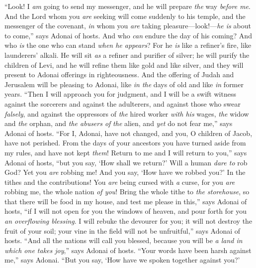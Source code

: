 \begin{biblechapter} %
 “Look! I \textit{am} going to send my messenger, and he will prepare \textit{the} way \textit{before me}. And the Lord whom you \textit{are} seeking will come suddenly to his temple, and the messenger of the covenant, \textit{in} whom you \textit{are} taking pleasure—look!—\textit{he is} about to come,” says Adonai of hosts.
\verse And who \textit{can} endure the day of his coming? And who \textit{is} the one who can stand \textit{when he appears}? For he \textit{is} like a refiner’s fire, like launderers’ alkali.
\verse He will sit \textit{as} a refiner and purifier of silver; he will purify the children of Levi, and he will refine them like gold and like silver, and they will present to Adonai offerings in righteousness.
\verse And the offering of Judah and Jerusalem will be pleasing to Adonai, like \textit{in the} days of old and like \textit{in} former years.
\verse “Then I will approach you for judgment, and I will be a swift witness against the sorcerers and against the adulterers, and against those who swear \textit{falsely}, and against the oppressors of \textit{the} hired worker \textit{with his} wages, \textit{the} widow and \textit{the} orphan, and \textit{the abusers of} \textit{the} alien, and \textit{yet} do not fear me,” says Adonai of hosts.
 “For I, Adonai, have not changed, and you, O children of Jacob, have not perished.
\verse From the days of your ancestors you have turned aside from my rules, and have not kept \textit{them}! Return to me and I will return to you,” says Adonai of hosts, “but you say, ‘How shall we return?’
\verse Will a human \textit{dare to} rob God? Yet you \textit{are} robbing me! And you say, ‘How have we robbed you?’ In the tithes and the contributions!
\verse You \textit{are} being cursed with \textit{a} curse, for you \textit{are} robbing me, the whole nation \textit{of you}!
\verse Bring the whole tithe to \textit{the storehouse}, so that there will be food in my house, and test me please in this,” says Adonai of hosts, “if I will not open for you the windows of heaven, and pour forth for you \textit{an overflowing blessing}.
\verse I will rebuke the devourer for you; it will not destroy the fruit of your soil; your vine in the field will not be unfruitful,” says Adonai of hosts.
\verse “And all the nations will call you blessed, because you will be \textit{a land in which one takes joy},” says Adonai of hosts.
\verse “Your words have been harsh against me,” says Adonai. “But you say, ‘How have we spoken together against you?’

\end{biblechapter}
